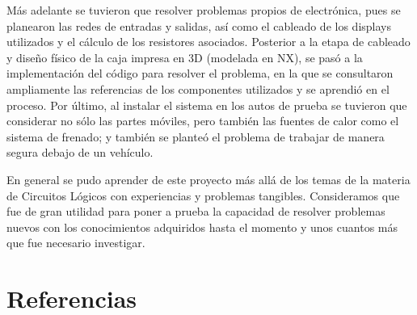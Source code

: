 \documentclass[a4paper,11pt]{article}
\begin{document}
    Más adelante se tuvieron que resolver problemas propios de electrónica, pues se planearon las redes de entradas y salidas, así como el cableado de los displays utilizados y el cálculo de los resistores asociados. Posterior a la etapa de cableado y diseño físico de la caja impresa en 3D (modelada en NX), se pasó a la implementación del código para resolver el problema, en la que se consultaron ampliamente las referencias de los componentes utilizados y se aprendió en el proceso. Por último, al instalar el sistema en los autos de prueba se tuvieron que considerar no sólo las partes móviles, pero también las fuentes de calor como el sistema de frenado; y también se planteó el problema de trabajar de manera segura debajo de un vehículo.

    En general se pudo aprender de este proyecto más allá de los temas de la materia de Circuitos Lógicos con experiencias y problemas tangibles. Consideramos que fue de gran utilidad para poner a prueba la capacidad de resolver problemas nuevos con los conocimientos adquiridos hasta el momento y unos cuantos más que fue necesario investigar.

\section*{Referencias}
\end{document}
